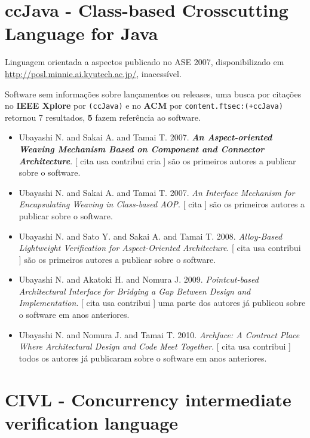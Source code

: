 \section{ccJava - Class-based Crosscutting Language for Java}

Linguagem orientada a aspectos
publicado no ASE 2007,
disponibilizado em \url{http://posl.minnie.ai.kyutech.ac.jp/},
inacessível.

Software sem informações sobre lançamentos ou releases,
uma busca por citações no {\bf IEEE Xplore} por
\texttt{(ccJava)}
e no {\bf ACM} por
\texttt{content.ftsec:(+ccJava)}
retornou
7 resultados,
{\bf 5} fazem referência ao software.

\begin{itemize}
\item Ubayashi N. and Sakai A. and Tamai T.
      2007.
        \textbf{\textit{ An Aspect-oriented Weaving Mechanism Based on Component and Connector Architecture}}.
      [
          cita
          usa
          contribui
          cria
      ]
são os primeiros autores a publicar sobre o software.
\item Ubayashi N. and Sakai A. and Tamai T.
      2007.
        \textit{ An Interface Mechanism for Encapsulating Weaving in Class-based AOP}.
      [
          cita
      ]
são os primeiros autores a publicar sobre o software.
\item Ubayashi N. and Sato Y. and Sakai A. and Tamai T.
      2008.
        \textit{ Alloy-Based Lightweight Verification for Aspect-Oriented Architecture}.
      [
          cita
          usa
          contribui
      ]
são os primeiros autores a publicar sobre o software.
\item Ubayashi N. and Akatoki H. and Nomura J.
      2009.
        \textit{ Pointcut-based Architectural Interface for Bridging a Gap Between Design and Implementation}.
      [
          cita
          usa
          contribui
      ]
uma parte dos autores já publicou sobre o software em anos anteriores.
\item Ubayashi N. and Nomura J. and Tamai T.
      2010.
        \textit{ Archface: A Contract Place Where Architectural Design and Code Meet Together}.
      [
          cita
          usa
          contribui
      ]
todos os autores já publicaram sobre o software em anos anteriores.
\end{itemize}
\section{CIVL - Concurrency intermediate verification language}

